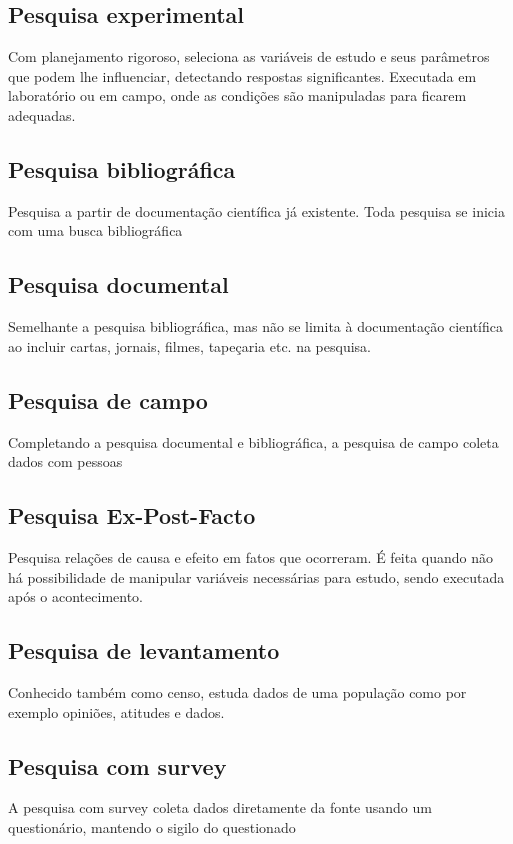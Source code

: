 \subsection{Pesquisa experimental}
Com planejamento rigoroso, seleciona as variáveis de estudo e seus parâmetros que podem lhe influenciar, detectando respostas significantes. Executada em laboratório ou em campo, onde as condições são manipuladas para ficarem adequadas.

\subsection{Pesquisa bibliográfica}
Pesquisa a partir de documentação científica já existente. Toda pesquisa se inicia com uma busca bibliográfica

\subsection{Pesquisa documental}
Semelhante a pesquisa bibliográfica, mas não se limita à documentação científica ao incluir cartas, jornais, filmes, tapeçaria etc. na pesquisa.

\subsection{Pesquisa de campo}
Completando a pesquisa documental e bibliográfica, a pesquisa de campo coleta dados com pessoas

\subsection{Pesquisa Ex-Post-Facto}
Pesquisa relações de causa e efeito em fatos que ocorreram. É feita quando não há possibilidade de manipular variáveis necessárias para estudo, sendo executada após o acontecimento.

\subsection{Pesquisa de levantamento}
Conhecido também como censo, estuda dados de uma população como por exemplo opiniões, atitudes e dados.

\subsection{Pesquisa com survey}
A pesquisa com survey coleta dados diretamente da fonte usando um questionário, mantendo o sigilo do questionado

